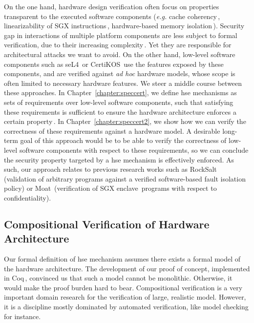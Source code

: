 On the one hand, hardware design verification often focus on properties
transparent to the executed software components (\emph{e.g.} cache
coherency\,\cite{stern1995cachecoherence}, linearizability of SGX
instructions\,\cite{leslie2015sgx}, hardware-based memory
isolation\,\cite{lie2003xom}).
%
Security gap in interactions of multiple platform components are less subject to
formal verification, due to their increasing
complexity\,\cite{potlapally2011hardwaresecurity}.
%
Yet they are responsible for architectural attacks we want to avoid.
%
On the other hand, low-level software components such as
seL4\,\cite{klein2009sel4} or CertiKOS\,\cite{gu2016certikos} use the features
exposed by these components, and are verified against \emph{ad hoc} hardware
models, whose scope is often limited to necessary hardware features.
%
We steer a middle course between these approaches.
%
In Chapter~\ref{chapter:speccert}, we define \ac{hse} mechanisms as sets of
requirements over low-level software components, such that satisfying these
requirements is sufficient to ensure the hardware architecture enforces a
certain property\,\cite{letan2016speccert}.
%
In Chapter~\ref{chapter:speccert2}, we show how we can verify the correctness of
these requirements against a hardware model.
%
A desirable long-term goal of this approach would be to be able to verify the
correctness of low-level software components with respect to these requirements,
so we can conclude the security property targeted by a \ac{hse} mechanism is
effectively enforced.
%
As such, our approach relates to previous research works such as
RockSalt\,\cite{morrisett2012rocksalt} (validation of arbitrary programs against
a verified software-based fault isolation\,\cite{wahbe1994sfi} policy) or
Moat\,\cite{sinha2015moat} (verification of SGX
enclave\,\cite{costan2016sgxexplained} programs with respect to
confidentiality).

\subsection{Compositional Verification of Hardware Architecture}

Our formal definition of \ac{hse} mechanism assumes there exists a formal model
of the hardware architecture.
%
The development of our proof of concept, implemented in
Coq\,\cite{letan2016speccertcode}, convinced us that such a model cannot be
monolithic.
%
Otherwise, it would make the proof burden hard to bear.
%
Compositional verification is a very important domain research for the
verification of large, realistic model.
%
However, it is a discipline mostly dominated by automated verification, like
model checking for instance.

